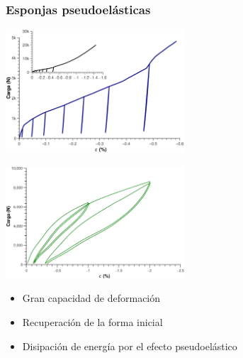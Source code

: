 \documentclass[usenames,dvipsnames]{beamer}
\begin{document}
\begin{frame}

\frametitle{Esponjas pseudoelásticas}

\begin{multicols}{2}

\includegraphics[width=0.5\textwidth]{img/intro/Cucompararesponja.eps}

\includegraphics[width=0.5\textwidth]{img/intro/EsponjacompararCu.eps}

\end{multicols}


 \begin{itemize}
  \item \alert<1>{Gran capacidad de deformación}
  \item \alert<2>{Recuperación de la forma inicial}
  \item \alert<3>{Disipación de energía por el efecto pseudoelástico}
 \end{itemize}

\end{frame}


% 
%   
%  

\end{document}
